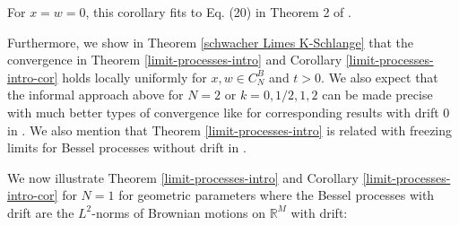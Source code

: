 \documentclass[reqno]{amsart}
\theoremstyle{plain}
\theoremstyle{definition}
\numberwithin{equation}{section}
\begin{document}
For $x=w=0$, this corollary fits to Eq. (20) in Theorem 2 of \cite{AKM2}.





 Furthermore, we
 show in Theorem \ref{schwacher Limes K-Schlange} that the convergence in Theorem \ref{limit-processes-intro}
 and  Corollary \ref{limit-processes-intro-cor} holds locally uniformly for
$x,w\in C_N^B$ and $t>0$. We also expect that the informal approach above for $N=2$ or $k=0,1/2,1,2$
can be made precise with much better types of convergence like for corresponding results with drift $0$ in \cite{AnV1, VW}.
We also mention that Theorem \ref{limit-processes-intro} is related with freezing limits for Bessel processes without drift in
\cite{AKM1, AKM2, AM, AHV,  AnV2, GK, V1, VW}.

We now illustrate Theorem \ref{limit-processes-intro}
and  Corollary \ref{limit-processes-intro-cor} for  $N=1$ for geometric parameters where the Bessel processes with drift are the $L^2$-norms
of Brownian motions on $\mathbb R^M$ with drift:
\end{document}

